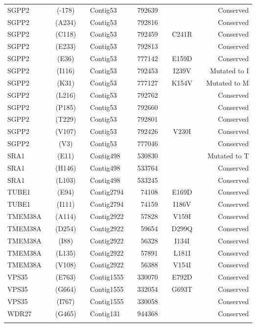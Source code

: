 \begin{center}
\begin{longtable}{lccclcrcccr}
SGPP2    & & (-178)  & & Contig53   & & 792639   & &         & & Conserved      \\
SGPP2    & & (A234)  & & Contig53   & & 792816   & &         & & Conserved      \\
SGPP2    & & (C118)  & & Contig53   & & 792459   & & C241R   & & Conserved      \\
SGPP2    & & (E233)  & & Contig53   & & 792813   & &         & & Conserved      \\
SGPP2    & & (E36)   & & Contig53   & & 777142   & & E159D   & & Conserved      \\
SGPP2    & & (I116)  & & Contig53   & & 792453   & & I239V   & & Mutated to I   \\
SGPP2    & & (K31)   & & Contig53   & & 777127   & & K154V   & & Mutated to M   \\
SGPP2    & & (L216)  & & Contig53   & & 792762   & &         & & Conserved      \\
SGPP2    & & (P185)  & & Contig53   & & 792660   & &         & & Conserved      \\
SGPP2    & & (T229)  & & Contig53   & & 792801   & &         & & Conserved      \\
SGPP2    & & (V107)  & & Contig53   & & 792426   & & V230I   & & Conserved      \\
SGPP2    & & (V3)    & & Contig53   & & 777046   & &         & & Conserved      \\
SRA1     & & (E11)   & & Contig498  & & 530830   & &         & & Mutated to T   \\
SRA1     & & (H146)  & & Contig498  & & 533764   & &         & & Conserved      \\
SRA1     & & (L103)  & & Contig498  & & 533245   & &         & & Conserved      \\
TUBE1    & & (E94)   & & Contig2794 & & 74108    & & E169D   & & Conserved      \\
TUBE1    & & (I111)  & & Contig2794 & & 74159    & & I186V   & & Conserved      \\
TMEM38A  & & (A114)  & & Contig2922 & & 57828    & & V159I   & & Conserved      \\
TMEM38A  & & (D254)  & & Contig2922 & & 59654    & & D299Q   & & Conserved      \\
TMEM38A  & & (I88)   & & Contig2922 & & 56328    & & I134I   & & Conserved      \\
TMEM38A  & & (L135)  & & Contig2922 & & 57891    & & L181I   & & Conserved      \\
TMEM38A  & & (V108)  & & Contig2922 & & 56388    & & V154I   & & Conserved      \\
VPS35    & & (E763)  & & Contig1555 & & 330070   & & E792D   & & Conserved      \\
VPS35    & & (G664)  & & Contig1555 & & 332054   & & G693T   & & Conserved      \\
VPS35    & & (I767)  & & Contig1555 & & 330058   & &         & & Conserved      \\
WDR27    & & (G465)  & & Contig131  & & 944368   & &         & & Conserved      \\
\label{app_t_site_positive_selection}
\end{longtable}
\end{center}
